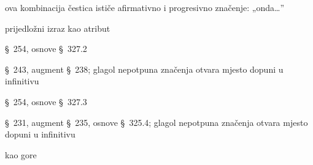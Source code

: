 \begin{description}[noitemsep]
\item[μὲν δὴ] ova kombinacija čestica ističe afirmativno i progresivno značenje: „onda\dots”
\item[περὶ ἀλλήλων] prijedložni izraz kao atribut
\item[ἦλθε] §~254, osnove §~327.2
\item[ἐπεθύμει] §~243, augment §~238; glagol nepotpuna značenja otvara mjesto dopuni u infinitivu
\item[ἰδεῖν] §~254, osnove §~327.3
\item[ἤθελεν] §~231, augment §~235, osnove §~325.4; glagol nepotpuna značenja otvara mjesto dopuni u infinitivu
\item[ἰδεῖν] kao gore
\end{description}




